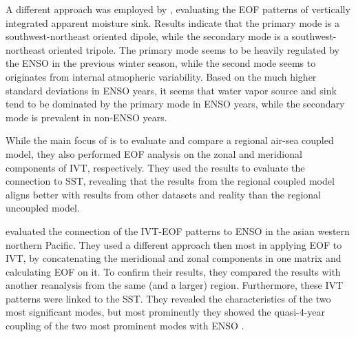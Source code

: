 A different approach was employed by \cite{zou_investigating_2020}, evaluating the EOF patterns of vertically integrated apparent moisture sink. 
Results indicate that the primary mode is a southwest-northeast oriented dipole, while the secondary mode is a southwest-northeast oriented tripole. 
The primary mode seems to be heavily regulated by the ENSO in the previous winter season, while the second mode seems to originates from internal atmopheric variability. 
Based on the much higher standard deviations in ENSO years, it seems that water vapor source and sink tend to be dominated by the primary mode in ENSO years, while the secondary mode is prevalent in non-ENSO years. 


While the main focus of \cite{yao_simulation_2013} is to evaluate and compare a regional air-sea coupled model, they also performed EOF analysis on the zonal and meridional components of IVT, respectively. 
They used the results to evaluate the connection to SST, revealing that the results from the regional coupled model aligns better with results from other datasets and reality than the regional uncoupled model. 


\citeauthor{li_quasi-4-yr_2012} evaluated the connection of the IVT-EOF patterns to ENSO in the asian western northern Pacific.
They used a different approach then most in applying EOF to IVT, by concatenating the meridional and zonal components in one matrix and calculating EOF on it. 
To confirm their results, they compared the results with another reanalysis from the same (and a larger) region. 
Furthermore, these IVT patterns were linked to the SST. 
They revealed the characteristics of the two most significant modes, but most prominently they showed the quasi-4-year coupling of the two most prominent modes with ENSO \cite{li_quasi-4-yr_2012}. 



